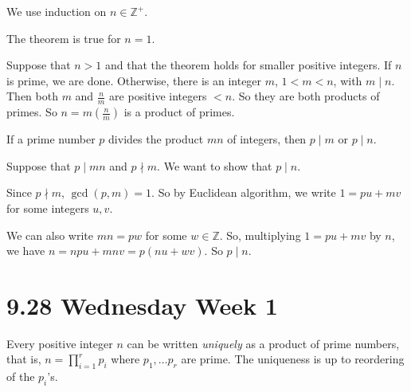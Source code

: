 \documentclass{notes}
\begin{document}
\begin{prf}
  We use induction on $n \in \mathbb Z^+$.

  The theorem is true for $n = 1$.

  Suppose that $n > 1$ and that the theorem holds for smaller positive integers.
  If $n$ is prime, we are done.
  Otherwise, there is an integer $m$, $1 < m < n$, with $m \mid n$.
  Then both $m$ and $\frac{n}{m}$ are positive integers $< n$.
  So they are both products of primes.
  So $n = m \left ( \frac{n}{m} \right )$ is a product of primes.
\end{prf}

\begin{lem}
  If a prime number $p$ divides the product $m n$ of integers, then $p \mid m$ or $p \mid n$.
\end{lem}

\begin{prf}
  Suppose that $p \mid m n$ and $p \nmid m$.
  We want to show that $p \mid n$.

  Since $p \nmid m$, $\gcd(p, m) = 1$.
  So by Euclidean algorithm, we write $1 = p u + m v$ for some integers $u, v$.

  We can also write $m n = p w$ for some $w \in \mathbb Z$.
  So, multiplying $1 = p u + m v$ by $n$, we have $n = n p u + m n v = p (n u + w v)$.
  So $p \mid n$.
\end{prf}

\newpage

\section{9.28 Wednesday Week 1}

\begin{thm}
  Every positive integer $n$ can be written \textit{uniquely} as a product of prime numbers, that is, $n = \prod_{i = 1}^r p_i$ where $p_1, \dots p_r$ are prime.
  The uniqueness is up to reordering of the $p_i$'s.
\end{thm}
\end{document}
